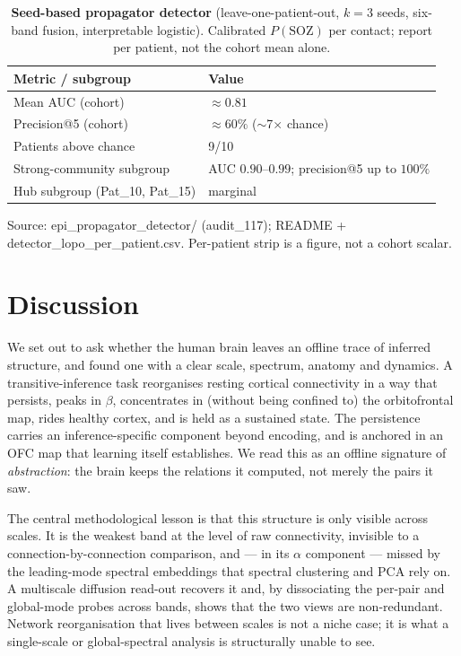 \documentclass[11pt]{article}
\begin{document}
\begin{table}[t]
\centering
\caption{\textbf{Seed-based propagator detector} (leave-one-patient-out,
$k=3$ seeds, six-band fusion, interpretable logistic). Calibrated $P(\mathrm{SOZ})$
per contact; report per patient, not the cohort mean alone.}
\label{tab:detector}
\begin{tabular}{ll}
\toprule
Metric / subgroup & Value \\
\midrule
Mean AUC (cohort)                 & $\approx0.81$ \\
Precision@5 (cohort)              & $\approx60\%$ ($\sim$7$\times$ chance) \\
Patients above chance             & 9/10 \\
Strong-community subgroup         & AUC $0.90$--$0.99$; precision@5 up to $100\%$ \\
Hub subgroup (Pat\_10, Pat\_15)   & marginal \\
\bottomrule
\end{tabular}
\par\smallskip
{\footnotesize Source: epi\_propagator\_detector/ (audit\_117);
README + detector\_lopo\_per\_patient.csv. Per-patient strip is a figure, not a
cohort scalar.}
\end{table}

\section{Discussion}

We set out to ask whether the human brain leaves an offline trace of inferred
structure, and found one with a clear scale, spectrum, anatomy and dynamics. A
transitive-inference task reorganises resting cortical connectivity in a way that
persists, peaks in $\beta$, concentrates in (without being confined to) the
orbitofrontal map, rides healthy cortex, and is held as a sustained state. The
persistence carries an inference-specific component beyond encoding, and is
anchored in an OFC map that learning
itself establishes. We read this as an offline signature of \emph{abstraction}:
the brain keeps the relations it computed, not merely the pairs it saw.

The central methodological lesson is that this structure is only visible across
scales. It is the weakest band at the level of raw connectivity, invisible to a
connection-by-connection comparison, and --- in its $\alpha$ component --- missed
by the leading-mode spectral embeddings that spectral clustering and PCA rely on.
A multiscale diffusion read-out recovers it and, by dissociating the per-pair and
global-mode probes across bands, shows that the two views are non-redundant.
Network reorganisation that lives between scales is not a niche case; it is what a
single-scale or global-spectral analysis is structurally unable to see.
\end{document}
